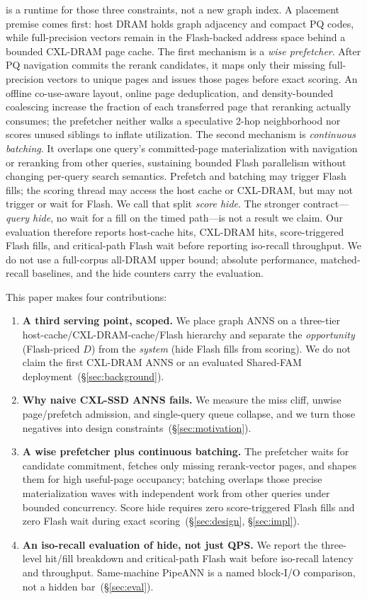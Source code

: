\sys{} is a runtime for those three constraints, not a new graph index.
A placement premise comes first: host DRAM holds graph adjacency and compact PQ codes, while full-precision vectors remain in the Flash-backed address space behind a bounded CXL-DRAM page cache.
The first mechanism is a \emph{wise prefetcher}.
After PQ navigation commits the rerank candidates, it maps only their missing full-precision vectors to unique pages and issues those pages before exact scoring.
An offline co-use-aware layout, online page deduplication, and density-bounded coalescing increase the fraction of each transferred page that reranking actually consumes; the prefetcher neither walks a speculative 2-hop neighborhood nor scores unused siblings to inflate utilization.
The second mechanism is \emph{continuous batching}.
It overlaps one query's committed-page materialization with navigation or reranking from other queries, sustaining bounded Flash parallelism without changing per-query search semantics.
Prefetch and batching may trigger Flash fills; the scoring thread may access the host cache or CXL-DRAM, but may not trigger or wait for Flash.
We call that split \emph{score hide}.
The stronger contract---\emph{query hide}, no wait for a fill on the timed path---is not a result we claim.
Our evaluation therefore reports host-cache hits, CXL-DRAM hits, score-triggered Flash fills, and critical-path Flash wait before reporting iso-recall throughput.
We do not use a full-corpus all-DRAM upper bound; absolute performance, matched-recall baselines, and the hide counters carry the evaluation.

This paper makes four contributions:
\begin{enumerate}
  \item \textbf{A third serving point, scoped.}
    We place graph ANNS on a three-tier host-cache/CXL-DRAM-cache/Flash hierarchy and separate the \emph{opportunity} (Flash-priced $D$) from the \emph{system} (hide Flash fills from scoring).
    We do not claim the first CXL-DRAM ANNS or an evaluated Shared-FAM deployment~(\S\ref{sec:background}).
  \item \textbf{Why naive CXL-SSD ANNS fails.}
    We measure the miss cliff, unwise page/prefetch admission, and single-query queue collapse, and we turn those negatives into design constraints~(\S\ref{sec:motivation}).
  \item \textbf{A wise prefetcher plus continuous batching.}
    The prefetcher waits for candidate commitment, fetches only missing rerank-vector pages, and shapes them for high useful-page occupancy; batching overlaps those precise materialization waves with independent work from other queries under bounded concurrency.
    Score hide requires zero score-triggered Flash fills and zero Flash wait during exact scoring~(\S\ref{sec:design}, \S\ref{sec:impl}).
  \item \textbf{An iso-recall evaluation of hide, not just QPS.}
    We report the three-level hit/fill breakdown and critical-path Flash wait before iso-recall latency and throughput.
    Same-machine PipeANN is a named block-I/O comparison, not a hidden bar~(\S\ref{sec:eval}).
\end{enumerate}
